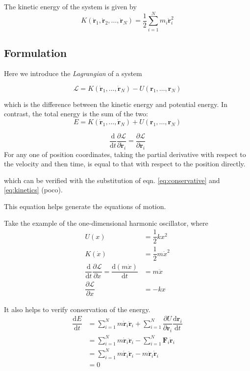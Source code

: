 \documentclass[
  10pt,
  twoside,
  openany,
  b5paper, %
  colorscheme = bootstrap-v4, %
]{qyxf-book}
\newcommand{\der}[2]{\dfrac{\md #1}{\md #2}}
\newcommand{\p}[2]{\dfrac{\partial #1}{\partial #2}}
\newcommand{\md}{\mathrm{d}}
\newcommand{\vF}{\boldsymbol{F}}
\newcommand{\vr}{\boldsymbol{r}}
\newcommand{\dvr}{\dot{\vr}}
\newcommand{\ddvr}{\ddot{\vr}}
\newcommand{\half}{\dfrac{1}{2}}
\newcommand{\sumin}{\sum_{i=1}^N}
\newcommand{\lag}{\mathcal{L}} %
\begin{document}
The kinetic energy of the system is given by
\begin{equation}
	K(\dvr_1, \dvr_2, \dots, \dvr_N)=\half\sum_{i=1}^{N}m_i\dvr_i^2 \label{eq:kinetics}
\end{equation}

\subsection{Formulation}
Here we introduce the \textit{Lagrangian} of a system
\begin{tcolorbox}
	\begin{equation}
		\lag=K(\dvr_1, \dots, \dvr_N)-U(\vr_1, \dots, \vr_N)
	\end{equation}
\end{tcolorbox}
which is the difference between the kinetic energy and potential energy. In contrast, the total energy is the sum of the two:
\begin{equation}
	E=K(\dvr_1, \dots, \dvr_N)+U(\vr_1, \dots, \vr_N)
\end{equation}

\begin{tcolorbox}[title={The Euler-Lagrangian equation}]
	\begin{equation}
		\der{}{t}\p{\lag}{\dvr_i}=\p{\lag}{\vr_i} \label{eq:euler-lagrangian}
	\end{equation}
	For any one of position coordinates, taking the partial derivative with respect to the velocity and then time, is equal to that with respect to the position directly.
\end{tcolorbox}
which can be verified with the substitution of eqn. \ref{eq:conservative} and \ref{eq:kinetics} (poco).

This equation helps generate the equations of motion. 

\example
Take the example of the one-dimensional harmonic oscillator, where
\begin{align*}
	U(x)&=\half kx^2\\
	K(\dot{x})&=\half m\dot{x}^2\\
	\der{}{t}\p{\lag}{\dot{x}}=\der{(m\dot{x})}{t}&=m\ddot{x}\\
	\p{\lag}{x}&=-kx
\end{align*}

It also helps to verify conservation of the energy.
\begin{align*}
	\der{E}{t}&=\sumin m\dvr_i\ddvr_i+\sumin\p{U}{\vr_i}\der{\vr_i}{t}\\
	&=\sumin m\dvr_i\ddvr_i-\sumin\vF_i\dvr_i\\
	&=\sumin m\dvr_i\ddvr_i-m\ddvr_i\dvr_i\\
	&=0
\end{align*}
\end{document}
